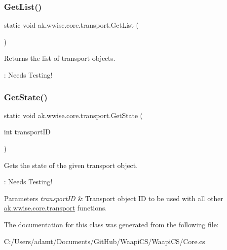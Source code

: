 \subsubsection{\texorpdfstring{Get\+List()}{GetList()}}
{\footnotesize\ttfamily static void ak.\+wwise.\+core.\+transport.\+Get\+List (\begin{DoxyParamCaption}{ }\end{DoxyParamCaption})\hspace{0.3cm}{\ttfamily [static]}}



Returns the list of transport objects. 

\+: Needs Testing! \mbox{\label{classak_1_1wwise_1_1core_1_1transport_a884e837f29fa1ac8f212dd981d1a6df6}} 
\subsubsection{\texorpdfstring{Get\+State()}{GetState()}}
{\footnotesize\ttfamily static void ak.\+wwise.\+core.\+transport.\+Get\+State (\begin{DoxyParamCaption}\item[{int}]{transport\+ID }\end{DoxyParamCaption})\hspace{0.3cm}{\ttfamily [static]}}



Gets the state of the given transport object. 

\+: Needs Testing!


\begin{DoxyParams}{Parameters}
{\em transport\+ID} & Transport object ID to be used with all other \mbox{\hyperlink{classak_1_1wwise_1_1core_1_1transport}{ak.\+wwise.\+core.\+transport}} functions.\\
\hline
\end{DoxyParams}


The documentation for this class was generated from the following file\+:\begin{DoxyCompactItemize}
\item 
C\+:/\+Users/adamt/\+Documents/\+Git\+Hub/\+Waapi\+C\+S/\+Waapi\+C\+S/Core.\+cs\end{DoxyCompactItemize}
